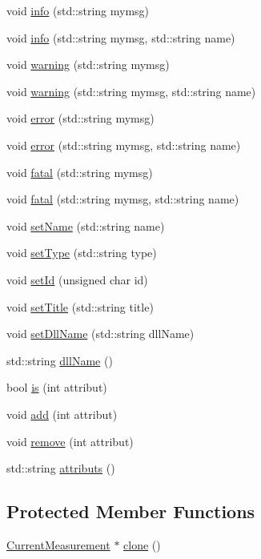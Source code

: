 \begin{DoxyCompactItemize}
\item 
void \hyperlink{classObject_a644fd329ea4cb85f54fa6846484b84a8}{info} (std::string mymsg)
\item 
void \hyperlink{classObject_a1ca123253dfd30fc28b156f521dcbdae}{info} (std::string mymsg, std::string name)
\item 
void \hyperlink{classObject_a65cd4fda577711660821fd2cd5a3b4c9}{warning} (std::string mymsg)
\item 
void \hyperlink{classObject_a11f101db4dd73d9391b0231818881d86}{warning} (std::string mymsg, std::string name)
\item 
void \hyperlink{classObject_a204a95f57818c0f811933917a30eff45}{error} (std::string mymsg)
\item 
void \hyperlink{classObject_ad7f6c457733082efa2f9ff5f5c8e119a}{error} (std::string mymsg, std::string name)
\item 
void \hyperlink{classObject_aad5a16aac7516ce65bd5ec02ab07fc80}{fatal} (std::string mymsg)
\item 
void \hyperlink{classObject_ae62acd3d09f716220f75f252dc38bc9a}{fatal} (std::string mymsg, std::string name)
\item 
void \hyperlink{classObject_ae30fea75683c2d149b6b6d17c09ecd0c}{setName} (std::string name)
\item 
void \hyperlink{classObject_aae534cc9d982bcb9b99fd505f2e103a5}{setType} (std::string type)
\item 
void \hyperlink{classObject_a398fe08cba594a0ce6891d59fe4f159f}{setId} (unsigned char id)
\item 
void \hyperlink{classObject_a89557dbbad5bcaa02652f5d7fa35d20f}{setTitle} (std::string title)
\item 
void \hyperlink{classObject_a870c5af919958c2136623b2d7816d123}{setDllName} (std::string dllName)
\item 
std::string \hyperlink{classObject_a2e3947f2870094c332d7454117f3ec63}{dllName} ()
\item 
bool \hyperlink{classAttrib_a704f26af560909ad22065083bb7d4c34}{is} (int attribut)
\item 
void \hyperlink{classAttrib_a235f773af19c900264a190b00a3b4ad7}{add} (int attribut)
\item 
void \hyperlink{classAttrib_a7d4ef7e32d93cb287792b87b857e79f3}{remove} (int attribut)
\item 
std::string \hyperlink{classAttrib_aee7bbf16b144887f196e1341b24f8a26}{attributs} ()
\end{DoxyCompactItemize}
\subsection*{Protected Member Functions}
\begin{DoxyCompactItemize}
\item 
\hyperlink{classCurrentMeasurement_1_1CurrentMeasurement}{CurrentMeasurement} $\ast$ \hyperlink{classCurrentMeasurement_a7722435fcc404fe4761c3fa96f3b6338}{clone} ()
\end{DoxyCompactItemize}
